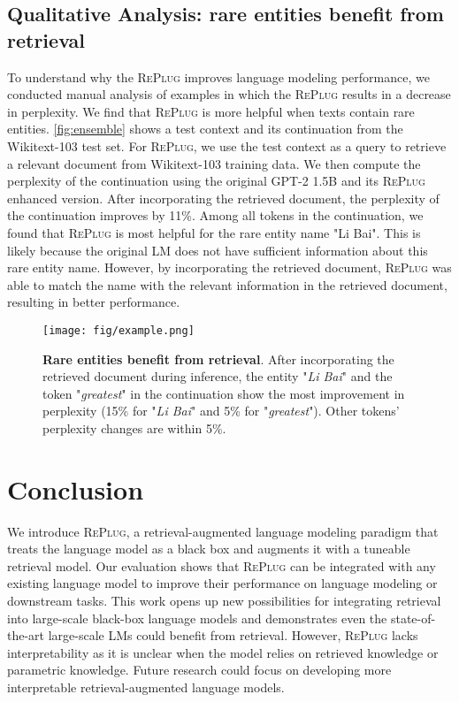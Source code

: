 \documentclass[nohyperref]{article}
\newcommand{\model}{\textsc{RePlug}\xspace}
\theoremstyle{plain}
\theoremstyle{definition}
\theoremstyle{remark}
\begin{document}
\subsection{Qualitative Analysis: rare entities benefit from retrieval}
To understand why the \model improves language modeling performance, we conducted manual analysis of examples in which the \model results in a decrease in perplexity. We find that \model is more helpful when texts contain rare entities.
\autoref{fig:ensemble} shows a test context and its continuation from the Wikitext-103 test set. For \model, we use the test context as a query to retrieve a relevant document from Wikitext-103 training data. We then compute the perplexity of the continuation using the original GPT-2 1.5B and its \model enhanced version. After incorporating the retrieved document, the perplexity of the continuation improves by 11\%. 
Among all tokens in the continuation, we found that \model is most helpful for the rare entity name "Li Bai".
This is likely because the original LM does not have sufficient information about this rare entity name. However, by incorporating the retrieved document, \model was able to match the name with the relevant information in the retrieved document, resulting in better performance.




\begin{figure}[h]
\centering 
\texttt{[image: fig/example.png]}
\caption{\textbf{Rare entities benefit from
retrieval}. After incorporating the retrieved document during inference, the entity "\textit{Li Bai}" and the token "\textit{greatest}" in the continuation show the most improvement in perplexity (15\% for "\textit{Li Bai}" and 5\% for "\textit{greatest}"). Other tokens' perplexity changes are within 5\%.}
\label{fig:ensemble}
\end{figure}




%
 
\section{Conclusion}
We introduce \model, a retrieval-augmented language modeling paradigm that treats the language model as a black box and augments it with a tuneable retrieval model. Our evaluation shows that \model can be integrated with any existing language model to improve their performance on language modeling or downstream tasks. This work opens up new possibilities for integrating retrieval into large-scale black-box language models and demonstrates even the state-of-the-art large-scale LMs could benefit from retrieval. However, \model lacks interpretability as it is unclear when the model relies on retrieved knowledge or parametric knowledge. Future research could focus on developing more interpretable retrieval-augmented language models.
\end{document}
